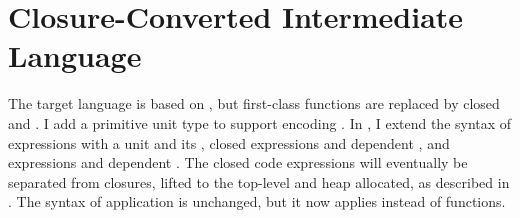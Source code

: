 \newcommand{\FigCCANFRed}[1][t]{
  \begin{figure}[#1]
    \judgshape{\tM \mapsto \tMpr}
    \begin{reductionrules}
      \tK\hw{\tappe{\tcloe{(\tnfune{(\tn:\tMpr_{\tcolor{A}},\tx:\tMin{A})}{\tM})}{\tVpr}}{\tV}} & \mapsto_{\beta} & \tK\hhw{\subst{\subst{\tM}{\tVpr}{\tn}}{\tV}{\tx}}
      \stepnewline

      \tK\hw{\tfste{\tpaire{\tVone}{\tVtwo}}} & \mapsto_{\pi_{1}} & \tK\hw{\tVone}
      \stepnewline

      \tK\hw{\tsnde{\tpaire{\tVone}{\tVtwo}}} & \mapsto_{\pi_{2}} & \tK\hw{\tVtwo}
      \stepnewline

      \tlete{\tx}{\tV}{\tM} & \mapsto_{\zeta} & \subst{\tM}{\tV}{\tx}
    \end{reductionrules}
    \judgshape{\tstepjudg[\mapsto^*]{}{\tM}{\tMpr}}
    \begin{mathpar}
      \inferrule*[right=\defrule{RedA-Refl}]
      {~}
      {\tstepjudg[\mapsto^*]{}{\tM}{\tM}}

      \inferrule*[right=\defrule{RedA-Trans}]
      {\tM \mapsto \tMone \\
       \tstepjudg[\mapsto^*]{}{\tMone}{\tMpr}}
      {\tstepjudg[\mapsto^*]{}{\tM}{\tMpr}}
    \end{mathpar}
    \judgshape{\teval{\tM} = \tV}
    \begin{displaymath}
      \begin{array}{rcll}
        \teval{\tM} & = & \tV & \text{if \im{\wf{}{\tM}} and \im{\tM \mapsto^* \tV} and \im{\tV \not\mapsto \tVpr}}
      \end{array}
    \end{displaymath}
    \caption{\tlang ANF Machine Evaluation}
    \label{fig:abs-cc:cc-cc:anf-eval}
  \end{figure}
}

\section{Closure-Converted Intermediate Language}
\label{sec:abs-cc:target}

\FigCCCCSyntax
The target language \tlang is based on \slang, but first-class functions are
replaced by closed  and .
I add a primitive unit type \im{\tunitty} to support encoding
.
In , I extend the syntax of expressions with a
unit  \im{\tnpaire{}} and its  \im{\tunitty}, closed
 expressions \im{\tnfune{\tn:\tApr,\tx:\tA}{\te}} and dependent
  \im{\tcodety{\tn:\tApr,\tx:\tA}{\tB}}, and 
expressions \im{\tcloe{\te}{\tepr}} and dependent  
\im{\tpity{\tx}{\tA}{\tB}}.
The closed code expressions will eventually be separated from closures, lifted
to the top-level and heap allocated, as described in .
The syntax of application \im{\tappe{\te}{\tepr}} is unchanged, but it now
applies  instead of functions.


